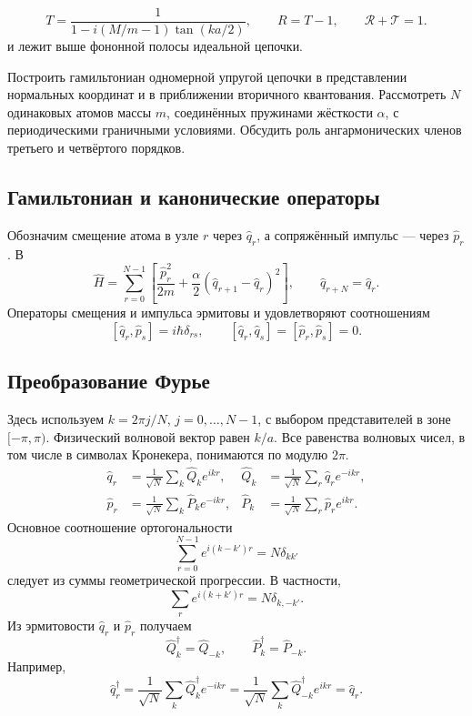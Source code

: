 \documentclass[../final.tex]{subfiles}
\begin{document}
\answer
\[
    T=\frac1{1-i(M/m-1)\tan(ka/2)},\qquad R=T-1,
    \qquad \mathcal R+\mathcal T=1.
\]
 и лежит выше
фононной полосы идеальной цепочки.

\clearpage
{}

\condition
Построить гамильтониан одномерной упругой цепочки
в представлении нормальных координат и в приближении вторичного
квантования. Рассмотреть $N$ одинаковых атомов массы $m$,
соединённых пружинами жёсткости $\alpha$, с периодическими
граничными условиями. Обсудить роль ангармонических членов
третьего и четвёртого порядков.

\solution

\subsection*{Гамильтониан и канонические операторы}

Обозначим смещение атома в узле $r$ через $\hat q_r$,
а сопряжённый импульс --- через $\hat p_r$.
В 
\[
    \hat H=\sum_{r=0}^{N-1}
       \left[\frac{\hat p_r^2}{2m}
             +\frac\alpha2(\hat q_{r+1}-\hat q_r)^2\right],
    \qquad \hat q_{r+N}=\hat q_r.
\]
Операторы смещения и импульса эрмитовы и удовлетворяют соотношениям
\[
    [\hat q_r,\hat p_s]=i\hbar\delta_{rs},\qquad
    [\hat q_r,\hat q_s]=[\hat p_r,\hat p_s]=0.
\]

\subsection*{Преобразование Фурье}

Здесь используем 
$k=2\pi j/N$, $j=0,\ldots,N-1$, с выбором представителей
в зоне $[-\pi,\pi)$. Физический волновой вектор равен $k/a$.
Все равенства волновых чисел, в том числе в символах Кронекера,
понимаются по модулю $2\pi$.
\begin{align*}
    \hat q_r&=\frac1{\sqrt N}\sum_k\hat Q_k e^{ikr},
        &\hat Q_k&=\frac1{\sqrt N}\sum_r\hat q_r e^{-ikr},\\
    \hat p_r&=\frac1{\sqrt N}\sum_k\hat P_k e^{-ikr},
        &\hat P_k&=\frac1{\sqrt N}\sum_r\hat p_r e^{ikr}.
\end{align*}
Основное соотношение ортогональности
\[
    \sum_{r=0}^{N-1}e^{i(k-k')r}=N\delta_{kk'}
\]
следует из суммы геометрической прогрессии.
В частности,
\[
    \sum_r e^{i(k+k')r}=N\delta_{k,-k'}.
\]
Из эрмитовости $\hat q_r$ и $\hat p_r$ получаем
\[
    \hat Q_k^\dagger=\hat Q_{-k},\qquad
    \hat P_k^\dagger=\hat P_{-k}.
\]
Например,
\[
    \hat q_r^\dagger
       =\frac1{\sqrt N}\sum_k\hat Q_k^\dagger e^{-ikr}
       =\frac1{\sqrt N}\sum_k\hat Q_{-k}^\dagger e^{ikr}
       =\hat q_r.
\]
\end{document}
